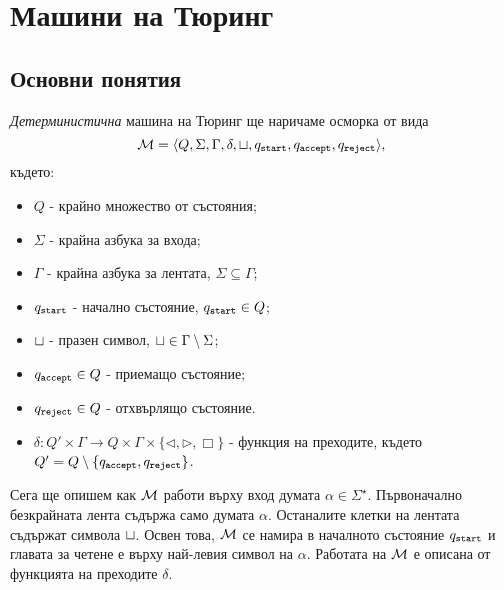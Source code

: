 \chapter{Машини на Тюринг}

\newcommand{\tape}[1]{\dots\blank\blank\blank{#1}\blank\blank\blank\dots}

\newcommand{\goleft}{\lhd}
\newcommand{\goright}{\rhd}
\newcommand{\stay}{\Box}



\section{Основни понятия}
{\em Детерминистична} машина на Тюринг ще наричаме осморка от вида 
\[\mathcal{M} = \langle{Q,\Sigma,\Gamma,\delta,\sqcup,q_{\texttt{start}},q_{\texttt{accept}}, q_{\texttt{reject}}}\rangle,\] където:
\begin{itemize}
\item 
  $Q$ - крайно множество от състояния;
\item
  $\Sigma$ - крайна азбука за входа;
\item
  $\Gamma$ - крайна азбука за лентата, $\Sigma \subseteq \Gamma$;
\item
  $q_{\texttt{start}}$ - начално състояние, $q_{\texttt{start}} \in Q$;
\item
  $\sqcup$ - празен символ,  $\sqcup \in \Gamma \setminus \Sigma$;
\item
  $q_{\texttt{accept}} \in Q$ - приемащо състояние;
\item
  $q_{\texttt{reject}} \in Q$ - отхвърлящо състояние.
\item
  $\delta:Q'\times\Gamma \to Q\times \Gamma \times \{\goleft,\goright,\stay\}$ - функция на преходите, където
  $Q' = Q \setminus\{q_{\texttt{accept}}, q_{\texttt{reject}}\}$.
\end{itemize}

Сега ще опишем как $\mathcal{M}$ работи върху вход думата $\alpha \in \Sigma^\star$.
Първоначално безкрайната лента съдържа само думата $\alpha$. Останалите клетки на лентата съдържат символа $\sqcup$.
Освен това, $\mathcal{M}$ се намира в началното състояние $q_{\texttt{start}}$ и главата за четене е върху най-левия символ на $\alpha$.
Работата на $\mathcal{M}$ е описана от функцията на преходите $\delta$.
  
